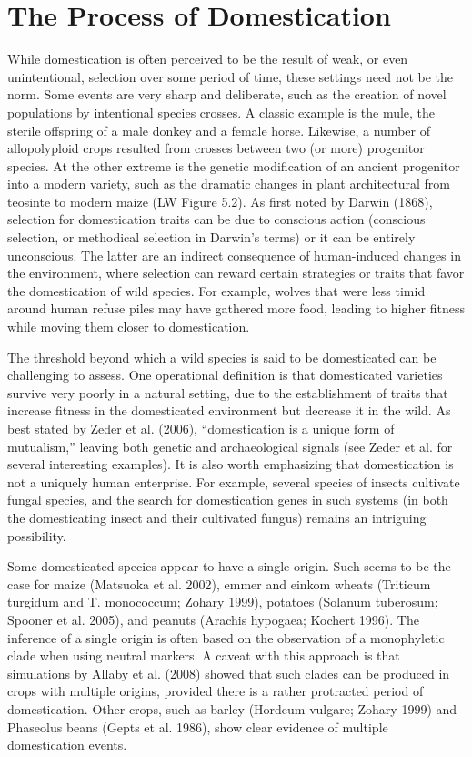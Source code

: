 \documentclass{article}
\begin{document}
\section{The Process of Domestication}
While domestication is often perceived to be the result of weak, or even unintentional, selection over some period of time, these settings need not be the norm. Some events are very sharp and deliberate, such as the creation of novel populations by intentional species crosses. A classic example is the mule, the sterile offspring of a male donkey and a female horse. Likewise, a number of allopolyploid crops resulted from crosses between two (or more) progenitor species. At the other extreme is the genetic modification of an ancient progenitor into a modern variety, such as the dramatic changes in plant architectural from teosinte to modern maize (LW Figure 5.2). As first noted by Darwin (1868), selection for domestication traits can be due to conscious action (conscious selection, or methodical selection in Darwin's terms) or it can be entirely unconscious. The latter are an indirect consequence of human-induced changes in the environment, where selection can reward certain strategies or traits that favor the domestication of wild species. For example, wolves that were less timid around human refuse piles may have gathered more food, leading to higher fitness while moving them closer to domestication.

The threshold beyond which a wild species is said to be domesticated can be challenging to assess. One operational definition is that domesticated varieties survive very poorly in a natural setting, due to the establishment of traits that increase fitness in the domesticated environment but decrease it in the wild. As best stated by Zeder et al. (2006), “domestication is a unique form of mutualism,” leaving both genetic and archaeological signals (see Zeder et al. for several interesting examples). It is also worth emphasizing that domestication is not a uniquely human enterprise. For example, several species of insects cultivate fungal species, and the search for domestication genes in such systems (in both the domesticating insect and their cultivated fungus) remains an intriguing possibility.

Some domesticated species appear to have a single origin. Such seems to be the case for maize (Matsuoka et al. 2002), emmer and einkom wheats (Triticum turgidum and T. monococcum; Zohary 1999), potatoes (Solanum tuberosum; Spooner et al. 2005), and peanuts (Arachis hypogaea; Kochert 1996). The inference of a single origin is often based on the observation of a monophyletic clade when using neutral markers. A caveat with this approach is that simulations by Allaby et al. (2008) showed that such clades can be produced in crops with multiple origins, provided there is a rather protracted period of domestication. Other crops, such as barley (Hordeum vulgare; Zohary 1999) and Phaseolus beans (Gepts et al. 1986), show clear evidence of multiple domestication events.
\end{document}
